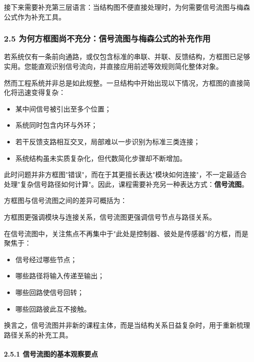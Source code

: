 \documentclass[
  11pt]{article}
\providecommand{\tightlist}{%
  \setlength{\itemsep}{0pt}\setlength{\parskip}{0pt}}
\renewenvironment{quote}
  {\begin{HandoutQuoteBox}\small\color{TitleBlue}\noindent\ignorespaces}
  {\end{HandoutQuoteBox}}
\begin{document}
接下来需要补充第三层语言：当结构图不便直接处理时，为何需要信号流图与梅森公式作为补充工具。

\subsubsection{2.5
为何方框图尚不充分：信号流图与梅森公式的补充作用}\label{ux4e3aux4f55ux65b9ux6846ux56feux5c1aux4e0dux5145ux5206ux4fe1ux53f7ux6d41ux56feux4e0eux6885ux68eeux516cux5f0fux7684ux8865ux5145ux4f5cux7528}

若系统仅有一条前向通路，或仅包含标准的串联、并联、反馈结构，方框图已足够实用。您能直观识别信号流向，并直接应用前述等效规则简化整体对象。

然而工程系统并非总是如此规整。一旦结构中开始出现以下情况，方框图的直接简化将迅速变得复杂：

\begin{itemize}
\tightlist
\item
  某中间信号被引出至多个位置；
\item
  系统同时包含内环与外环；
\item
  若干反馈支路相互交叉，局部难以一步识别为标准三类连接；
\item
  系统结构虽未实质复杂化，但代数简化步骤却不断增加。
\end{itemize}

此时问题并非方框图"错误"，而在于其更擅长表达"模块如何连接"，不一定最适合处理"复杂信号路径如何计算"。因此，课程需要补充另一种表达方式：\textbf{信号流图}。

方框图与信号流图之间的差异可概括为：

\begin{quote}
方框图更强调模块与连接关系，信号流图更强调信号节点与路径关系。
\end{quote}

在信号流图中，关注焦点不再集中于"此处是控制器、彼处是传感器"的方框，而是聚焦于：

\begin{itemize}
\tightlist
\item
  信号经过哪些节点；
\item
  哪些路径将输入传递至输出；
\item
  哪些回路使信号回转；
\item
  哪些回路彼此互不接触。
\end{itemize}

换言之，信号流图并非新的课程主体，而是当结构关系日益复杂时，用于重新梳理路径关系的补充工具。

\paragraph{2.5.1
信号流图的基本观察要点}\label{ux4fe1ux53f7ux6d41ux56feux7684ux57faux672cux89c2ux5bdfux8981ux70b9}
\end{document}
